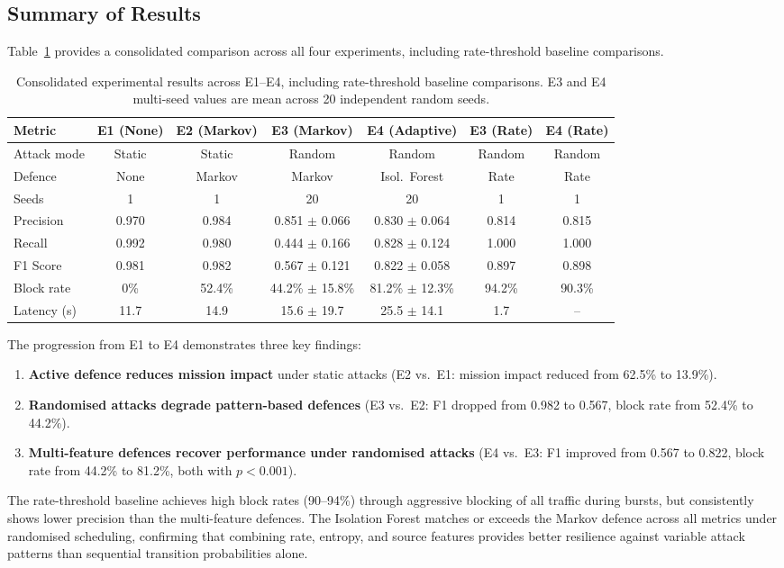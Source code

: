 \subsection{Summary of Results}

Table~\ref{tab:results_summary} provides a consolidated comparison across all four experiments, including rate-threshold baseline comparisons.

\begin{table}[t]
\centering
\caption{Consolidated experimental results across E1--E4, including rate-threshold baseline comparisons. E3 and E4 multi-seed values are mean across 20 independent random seeds.}
\label{tab:results_summary}
\renewcommand{\arraystretch}{1.2}
\begin{tabular}{lcccccc}
\toprule
\textbf{Metric} & \textbf{E1 (None)} & \textbf{E2 (Markov)} & \textbf{E3 (Markov)} & \textbf{E4 (Adaptive)} & \textbf{E3 (Rate)} & \textbf{E4 (Rate)} \\
\midrule
Attack mode & Static & Static & Random & Random & Random & Random \\
Defence & None & Markov & Markov & Isol.\ Forest & Rate & Rate \\
Seeds & 1 & 1 & 20 & 20 & 1 & 1 \\
Precision & 0.970 & 0.984 & 0.851 $\pm$ 0.066 & 0.830 $\pm$ 0.064 & 0.814 & 0.815 \\
Recall & 0.992 & 0.980 & 0.444 $\pm$ 0.166 & 0.828 $\pm$ 0.124 & 1.000 & 1.000 \\
F1 Score & 0.981 & 0.982 & 0.567 $\pm$ 0.121 & 0.822 $\pm$ 0.058 & 0.897 & 0.898 \\
Block rate & 0\% & 52.4\% & 44.2\% $\pm$ 15.8\% & 81.2\% $\pm$ 12.3\% & 94.2\% & 90.3\% \\
Latency (s) & 11.7 & 14.9 & 15.6 $\pm$ 19.7 & 25.5 $\pm$ 14.1 & 1.7 & -- \\
\bottomrule
\end{tabular}
\end{table}

The progression from E1 to E4 demonstrates three key findings:
\begin{enumerate}
    \item \textbf{Active defence reduces mission impact} under static attacks (E2 vs.\ E1: mission impact reduced from 62.5\% to 13.9\%).
    \item \textbf{Randomised attacks degrade pattern-based defences} (E3 vs.\ E2: F1 dropped from 0.982 to 0.567, block rate from 52.4\% to 44.2\%).
    \item \textbf{Multi-feature defences recover performance under randomised attacks} (E4 vs.\ E3: F1 improved from 0.567 to 0.822, block rate from 44.2\% to 81.2\%, both with $p < 0.001$).
\end{enumerate}

The rate-threshold baseline achieves high block rates (90--94\%) through aggressive blocking of all traffic during bursts, but consistently shows lower precision than the multi-feature defences.
The Isolation Forest matches or exceeds the Markov defence across all metrics under randomised scheduling, confirming that combining rate, entropy, and source features provides better resilience against variable attack patterns than sequential transition probabilities alone.